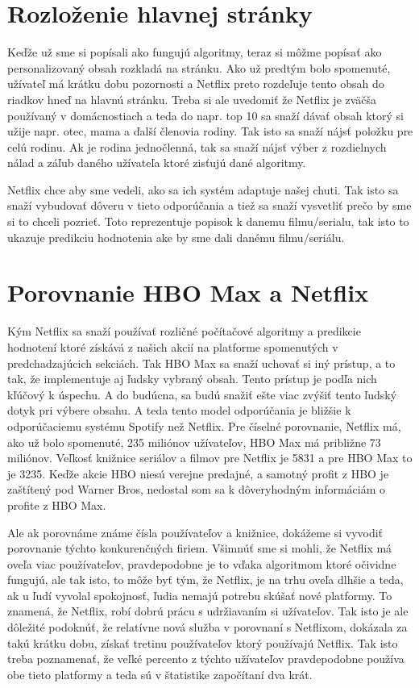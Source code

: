 \documentclass[10pt,twoside,slovak,a4paper]{article}
\begin{document}
\section{Rozloženie hlavnej stránky} \label{Rozloženie}
Keďže už sme si popísali ako fungujú algoritmy, teraz si môžme popísať ako personalizovaný obsah rozkladá na stránku. Ako už predtým bolo spomenuté, užívateľ má krátku dobu pozornosti a Netflix preto rozdeľuje tento obsah do riadkov hneď na hlavnú stránku. Treba si ale uvedomiť že Netflix je zväčša používaný v domácnostiach a teda do napr. top 10 sa snaží dávať obsah ktorý si užije napr. otec, mama a ďalší členovia rodiny. Tak isto sa snaží nájsť položku pre celú rodinu. Ak je rodina jednočlenná, tak sa snaží nájsť výber z rozdielnych nálad a záľub daného užívateľa ktoré zisťujú dané algoritmy.\cite{amatriain2015recommender}

Netflix chce aby sme vedeli, ako sa ich systém adaptuje našej chuti. Tak isto sa snaží vybudovať dôveru v tieto odporúčania a tiež sa snaží vysvetliť prečo by sme si to chceli pozrieť. Toto reprezentuje popisok k danemu filmu/serialu, tak isto to ukazuje predikciu hodnotenia ake by sme dali danému filmu/seriálu.

\section{Porovnanie HBO Max a Netflix} \label{Porovnanie}
Kým Netflix sa snaží používať rozličné počítačové algoritmy a predikcie hodnotení ktoré získává z našich akcií na platforme spomenutých v predchadzajúcich sekciách. Tak HBO Max sa snaží uchovať si iný prístup, a to tak, že implementuje aj ľudsky vybraný obsah. Tento prístup je podľa nich kľúčový k úspechu. A do budúcna, sa budú snažiť ešte viac zvýšiť tento ľudský dotyk pri výbere obsahu. A teda tento model odporúčania je bližšie k odporúčaciemu systému Spotify než Netflix. \cite{Arman1701480}
Pre číselné porovnanie, Netflix má, ako už bolo spomenuté, 235 miliónov užívateľov, HBO Max má približne 73 miliónov. Veľkosť knižnice seriálov a filmov pre Netflix je 5831 a pre HBO Max to je 3235. \cite{Arman1701480} Keďže akcie HBO niesú verejne predajné, a samotný profit z HBO je zaštítený pod Warner Bros, nedostal som sa k dôveryhodným informáciám o profite z HBO Max.\cite{WarnerBrosHBO}

Ale ak porovnáme známe čísla používateľov a knižnice, dokážeme si vyvodiť porovnanie týchto konkurenčných firiem. Všimnúť sme si mohli, že Netflix má oveľa viac používateľov, pravdepodobne je to vďaka algoritmom ktoré očividne fungujú, ale tak isto, to môže byť tým, že Netflix, je na trhu oveľa dlhšie a teda, ak u ľudí vyvolal spokojnosť, ľudia nemajú potrebu skúšať nové platformy. To znamená, že Netflix, robí dobrú prácu s udržiavaním si užívateľov. Tak isto je ale dôležité podoknúť, že relatívne nová služba v porovnaní s Netflixom, dokázala za takú krátku dobu, získať tretinu používateľov ktorý používajú Netflix. Tak isto treba poznamenať, že veľké percento z týchto užívateľov pravdepodobne používa obe tieto platformy a teda sú v štatistike započítaní dva krát.
\end{document}
